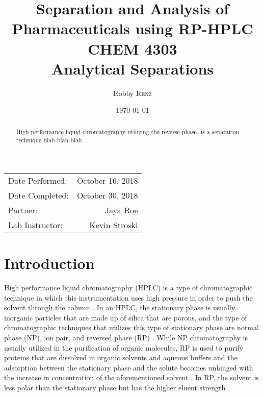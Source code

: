 \documentclass[a4paper, 12pt]{article}
\title{Separation and Analysis of Pharmaceuticals using RP-HPLC \\ CHEM 4303 \\ Analytical Separations} %
\author{Robby \textsc{Renz}} %
\date{\today} %
\begin{document}
\maketitle %

\begin{center}
\begin{tabular}{l r}
Date Performed: & October 16, 2018 \\ %
Date Completed: & October 30, 2018 \\
Partner: & Jaya Roe \\ %
Lab Instructor: & Kevin Stroski %
\end{tabular}
\end{center}


\begin{abstract}
	High-performance liquid chromatography utilizing the reverse-phase\dots{}is a separation technique blah blah blah \dots
\end{abstract}
\newpage


\section{Introduction}
High performance liquid chromatography (HPLC) is a type of chromatographic technique in which this instrumentation uses high pressure in order to push the solvent through the column \cite{harris}. In an HPLC, the stationary phase is usually inorganic particles that are made up of silica that are porous, and the type of chromatographic techniques that utilizes this type of stationary phase are normal phase (NP), ion pair, and reversed phase (RP) \cite{mold}. While NP chromatography is usually utilized in the purification of organic molecules, RP is used to purify proteins that are dissolved in organic solvents and aqueous buffers and the adsorption between the stationary phase and the solute becomes unhinged with the increase in concentration of the aforementioned solvent \cite{prep_hplc}. In RP, the solvent is less polar than the stationary phase but has the higher eluent strength \cite{harris}. 
\end{document}
